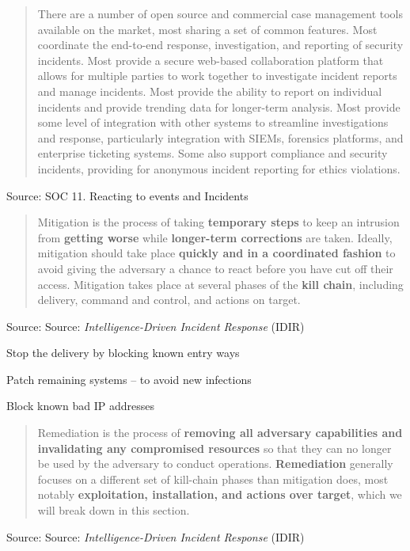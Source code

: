 \documentclass[Screen16to9,17pt]{foils}
\begin{document}


\begin{quote}
There are a number of open source and commercial case management tools available on the market, most sharing a set of common features. Most coordinate the end-to-end response, investigation, and reporting of security incidents. Most provide a secure web-based collaboration platform that allows for multiple parties to work together to investigate incident reports and manage incidents. Most provide the ability to report on individual incidents and provide trending data for longer-term analysis. Most provide some level of integration with other systems to streamline investigations and response, particularly integration with SIEMs, forensics platforms, and enterprise ticketing systems. Some also support compliance and security incidents, providing for anonymous incident reporting for ethics violations.
\end{quote}
Source:  SOC 11. Reacting to events and Incidents




\begin{quote}
Mitigation is the process of taking {\bf temporary steps} to keep an intrusion from {\bf getting worse} while {\bf longer-term corrections} are taken. Ideally, mitigation should take place {\bf quickly and in a coordinated fashion} to avoid giving the adversary a chance to react before you have cut off their access. Mitigation takes place at several phases of the {\bf kill chain}, including delivery, command and control, and actions on target.
\end{quote}
Source: Source: \emph{Intelligence-Driven Incident Response} (IDIR)

\begin{list2}
\item Stop the delivery by blocking known entry ways
\item Patch remaining systems -- to avoid new infections
\item Block known bad IP addresses
\end{list2}




\begin{quote}
Remediation is the process of {\bf removing all adversary capabilities and invalidating any compromised resources} so that they can no longer be used by the adversary to conduct operations. {\bf Remediation} generally focuses on a different set of kill-chain phases
than mitigation does, most notably {\bf exploitation, installation, and actions over target}, which we will break down in this section.
\end{quote}
Source: Source: \emph{Intelligence-Driven Incident Response} (IDIR)
\end{document}
